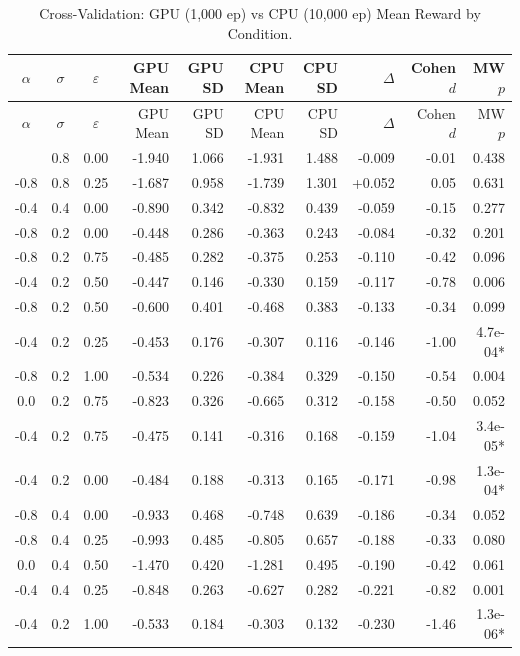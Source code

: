 \begin{longtable}{ccc|rr|rr|r|r|r}
\caption{Cross-Validation: GPU (1{,}000 ep) vs CPU (10{,}000 ep) Mean Reward by Condition.}
\label{tab:cross-validation} \\
\toprule
$\alpha$ & $\sigma$ & $\varepsilon$ & GPU Mean & GPU SD & CPU Mean & CPU SD & $\Delta$ & Cohen $d$ & MW $p$ \\
\midrule
\endfirsthead
\toprule
$\alpha$ & $\sigma$ & $\varepsilon$ & GPU Mean & GPU SD & CPU Mean & CPU SD & $\Delta$ & Cohen $d$ & MW $p$ \\
\midrule
\endhead
\bottomrule
\endfoot
  -0.8 & 0.8 & 0.00 & -1.940 & 1.066 & -1.931 & 1.488 & -0.009 & -0.01 & 0.438 \\
  -0.8 & 0.8 & 0.25 & -1.687 & 0.958 & -1.739 & 1.301 & +0.052 & 0.05 & 0.631 \\
  -0.4 & 0.4 & 0.00 & -0.890 & 0.342 & -0.832 & 0.439 & -0.059 & -0.15 & 0.277 \\
  -0.8 & 0.2 & 0.00 & -0.448 & 0.286 & -0.363 & 0.243 & -0.084 & -0.32 & 0.201 \\
  -0.8 & 0.2 & 0.75 & -0.485 & 0.282 & -0.375 & 0.253 & -0.110 & -0.42 & 0.096 \\
  -0.4 & 0.2 & 0.50 & -0.447 & 0.146 & -0.330 & 0.159 & -0.117 & -0.78 & 0.006 \\
  -0.8 & 0.2 & 0.50 & -0.600 & 0.401 & -0.468 & 0.383 & -0.133 & -0.34 & 0.099 \\
  -0.4 & 0.2 & 0.25 & -0.453 & 0.176 & -0.307 & 0.116 & -0.146 & -1.00 & 4.7e-04* \\
  -0.8 & 0.2 & 1.00 & -0.534 & 0.226 & -0.384 & 0.329 & -0.150 & -0.54 & 0.004 \\
  0.0 & 0.2 & 0.75 & -0.823 & 0.326 & -0.665 & 0.312 & -0.158 & -0.50 & 0.052 \\
  -0.4 & 0.2 & 0.75 & -0.475 & 0.141 & -0.316 & 0.168 & -0.159 & -1.04 & 3.4e-05* \\
  -0.4 & 0.2 & 0.00 & -0.484 & 0.188 & -0.313 & 0.165 & -0.171 & -0.98 & 1.3e-04* \\
  -0.8 & 0.4 & 0.00 & -0.933 & 0.468 & -0.748 & 0.639 & -0.186 & -0.34 & 0.052 \\
  -0.8 & 0.4 & 0.25 & -0.993 & 0.485 & -0.805 & 0.657 & -0.188 & -0.33 & 0.080 \\
  0.0 & 0.4 & 0.50 & -1.470 & 0.420 & -1.281 & 0.495 & -0.190 & -0.42 & 0.061 \\
  -0.4 & 0.4 & 0.25 & -0.848 & 0.263 & -0.627 & 0.282 & -0.221 & -0.82 & 0.001 \\
  -0.4 & 0.2 & 1.00 & -0.533 & 0.184 & -0.303 & 0.132 & -0.230 & -1.46 & 1.3e-06* \\

\end{longtable}
